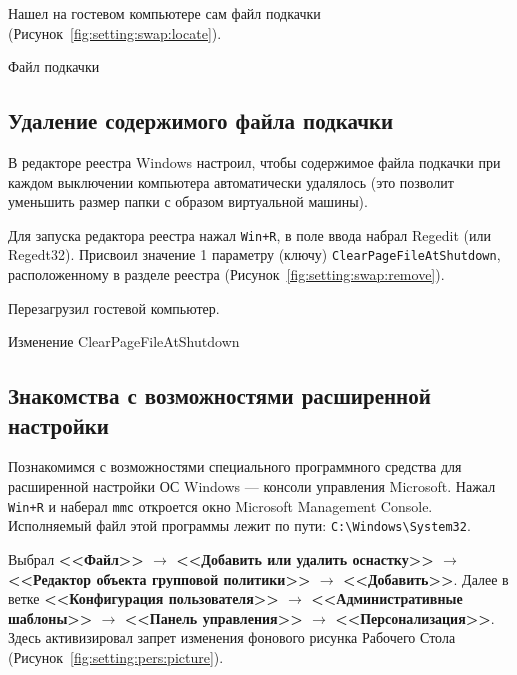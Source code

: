 Нашел на гостевом компьютере сам файл подкачки
(Рисунок~\ref{fig:setting:swap:locate}).

\begin{image}
	\caption{Файл подкачки}
	\label{fig:setting:swap:locate}
\end{image}

\clearpage

\subsection{Удаление содержимого файла подкачки}

В редакторе реестра Windows настроил, чтобы содержимое файла подкачки
при каждом выключении компьютера автоматически удалялось
(это позволит уменьшить размер папки с образом виртуальной машины).\par
Для запуска редактора реестра нажал \texttt{Win+R},
в поле ввода набрал Regedit (или Regedt32).
Присвоил значение 1 параметру (ключу) \texttt{ClearPageFileAtShutdown},
расположенному в разделе реестра (Рисунок~\ref{fig:setting:swap:remove}).\par
Перезагрузил гостевой компьютер.

\begin{image}
	\caption{Изменение ClearPageFileAtShutdown}
	\label{fig:setting:swap:remove}
\end{image}

\clearpage

\subsection{Знакомства с возможностями расширенной настройки}

Познакомимся с возможностями специального программного средства для
расширенной настройки ОС Windows --- консоли управления Microsoft.
Нажал \texttt{Win+R} и наберал \texttt{mmc}
откроется окно Microsoft Management Console.
Исполняемый файл этой программы лежит по пути: \verb|C:\Windows\System32|.

Выбрал \textbf{<<Файл>> $\rightarrow$ <<Добавить или удалить оснастку>>
$\rightarrow$ <<Редактор объекта групповой политики>>
$\rightarrow$ <<Добавить>>}.
Далее в ветке \textbf{<<Конфигурация пользователя>>
$\rightarrow$ <<Административные шаблоны>>
$\rightarrow$ <<Панель управления>> $\rightarrow$ <<Персонализация>>}.
Здесь активизировал запрет изменения фонового рисунка Рабочего Стола (Рисунок~\ref{fig:setting:pers:picture}).

